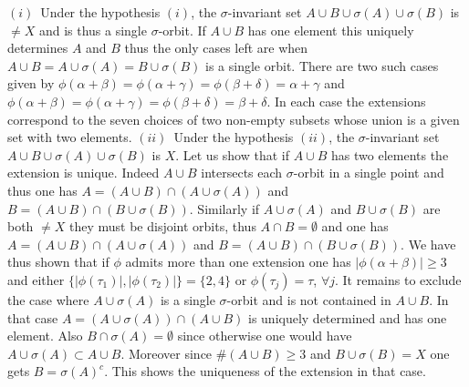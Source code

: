 \documentclass[12pt]{article}
\begin{document}
\proof 
$(i)$~Under the hypothesis $(i)$, the $\sigma$-invariant set $A\cup B \cup \sigma(A)\cup \sigma(B)$ is $\neq X$ and is thus  a single $\sigma$-orbit. If $A\cup B$ has one element this uniquely determines $A$ and $B$ thus the only cases left are when $A\cup B=A\cup \sigma(A)=B\cup \sigma(B)$ is a single orbit. There are two such cases given by 
$\phi(\alpha+\beta)=\phi(\alpha+\gamma)=\phi(\beta+\delta)=\alpha+\gamma$ and $\phi(\alpha+\beta)=\phi(\alpha+\gamma)=\phi(\beta+\delta)=\beta+\delta$. In each case the extensions correspond to the seven choices of two non-empty subsets whose union is a given set with two elements. \newline
$(ii)$~Under the hypothesis $(ii)$, the $\sigma$-invariant set $A\cup B \cup \sigma(A)\cup \sigma(B)$ is $X$. Let us show that if $A\cup B$ has two elements the extension is unique. Indeed $A\cup B$ intersects each $\sigma$-orbit in a single point and thus one has $A=(A\cup B)\cap (A\cup  \sigma(A))$ and $B=(A\cup B)\cap (B\cup  \sigma(B))$. Similarly if $A\cup  \sigma(A)$ and $B\cup  \sigma(B)$ are both $\neq X$ they must be disjoint orbits, thus $A\cap B=\emptyset$ and  one has $A=(A\cup B)\cap (A\cup  \sigma(A))$ and $B=(A\cup B)\cap (B\cup  \sigma(B))$. We have thus shown that if  $\phi$ admits more than one extension one has $\vert \phi(\alpha+\beta)\vert\geq 3$ and either $\{\vert\phi(\tau_1)\vert,\vert\phi(\tau_2)\vert\}=\{2,4\}$ or $\phi(\tau_j)=\tau$, $\forall j$. It remains to exclude the case where $A\cup  \sigma(A)$ is a single $\sigma$-orbit and is not contained in $A\cup B$. In that case $A=(A\cup  \sigma(A))\cap(A\cup B)$ is uniquely determined and has one element. Also $B\cap \sigma(A)=\emptyset$ since otherwise one would have $A\cup  \sigma(A)\subset A\cup B$.  Moreover since $\#(A\cup B)\geq 3$ and $B\cup \sigma(B)=X$ one gets $B=\sigma(A)^c$. This shows the uniqueness of the extension in that case. \endproof
\end{document}
